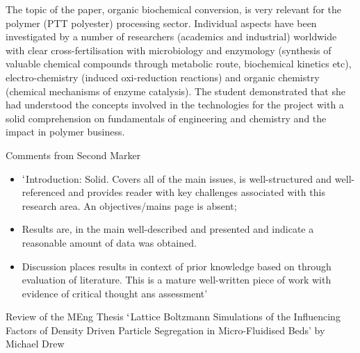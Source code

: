 \documentclass[14pt,twoside]{report}
\begin{document}
The topic of the paper, organic biochemical conversion, is very relevant for the polymer (PTT polyester) processing sector. Individual aspects have been investigated by a number of researchers (academics and industrial) worldwide with clear cross-fertilisation with microbiology and enzymology (synthesis of valuable chemical compounds through metabolic route, biochemical kinetics etc), electro-chemistry (induced oxi-reduction reactions) and organic chemistry (chemical mechanisms of enzyme catalysis). The student demonstrated that she had understood the concepts involved in the technologies for the project with a solid comprehension on fundamentals of engineering and chemistry and the impact in polymer business.    


\bigskip
\noindent
{\Large Comments from Second Marker}
\begin{itemize}
\item $\lq$Introduction: Solid. Covers all of the main issues, is well-structured and well-referenced and provides reader with key challenges associated with this research area. An objectives/mains page is absent;
\item Results are, in the main well-described and presented and indicate a reasonable amount of data was obtained.
\item Discussion places results in context of prior knowledge based on through evaluation of literature. This is a mature well-written piece of work with evidence of critical thought ans assessment'    
\end{itemize}


\clearpage


\bigskip

\begin{center}
  {\Large Review of the MEng Thesis $\lq$Lattice Boltzmann Simulations of the Influencing Factors of Density Driven Particle Segregation in Micro-Fluidised Beds' by Michael Drew}
\end{center}

\medskip
\end{document}
